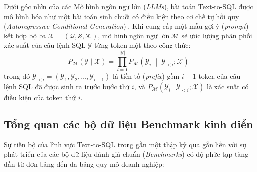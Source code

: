 \documentclass[12pt,a4paper]{report}
\begin{document}
Dưới góc nhìn của các Mô hình ngôn ngữ lớn (\textit{LLMs}), bài toán Text-to-SQL được mô hình hóa như một bài toán sinh chuỗi có điều kiện theo cơ chế tự hồi quy (\textit{Autoregressive Conditional Generation}) \cite{pourreza2023dinsql, dong2023c3, wang2025macsql}. Khi cung cấp một mẫu gợi ý (\textit{prompt}) kết hợp bộ ba $\mathcal{X} = (\mathcal{Q}, \mathcal{S}, \mathcal{K})$, mô hình ngôn ngữ lớn $\mathcal{M}$ sẽ ước lượng phân phối xác suất của câu lệnh SQL $\mathcal{Y}$ từng token một theo công thức:
\begin{equation}
    P_{\mathcal{M}}(\mathcal{Y} \mid \mathcal{X}) = \prod_{i=1}^{|\mathcal{Y}|} P_{\mathcal{M}}\left( \mathcal{Y}_i \;\middle|\; \mathcal{Y}_{<i}; \mathcal{X} \right)
    \label{eq:autoregressive_sql}
\end{equation}
trong đó $\mathcal{Y}_{<i} = (\mathcal{Y}_1, \mathcal{Y}_2, \dots, \mathcal{Y}_{i-1})$ là tiền tố (\textit{prefix}) gồm $i-1$ token của câu lệnh SQL đã được sinh ra trước bước thứ $i$, và $P_{\mathcal{M}}(\mathcal{Y}_i \mid \mathcal{Y}_{<i}; \mathcal{X})$ là xác suất có điều kiện của token thứ $i$.

\subsection{Tổng quan các bộ dữ liệu Benchmark kinh điển}

Sự tiến bộ của lĩnh vực Text-to-SQL trong gần một thập kỷ qua gắn liền với sự phát triển của các bộ dữ liệu đánh giá chuẩn (\textit{Benchmarks}) có độ phức tạp tăng dần từ đơn bảng đến đa bảng quy mô doanh nghiệp:
\end{document}
